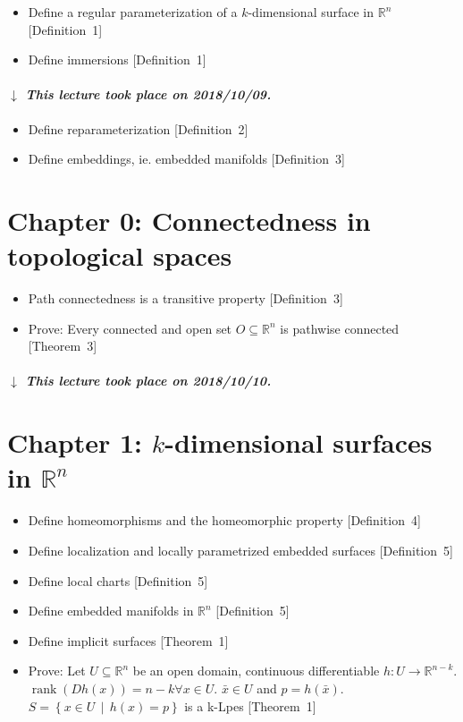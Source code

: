 \documentclass{article}
\numberwithin{lecref}{section}
\newcommand{\SetDef}[2]{\left\{#1\,\mid\,#2\right\}}
\newcommand{\dateref}[1]{%
  \begin{mdframed}[backgroundcolor=gray!10,innerbottommargin=0pt,innertopmargin=0pt]
    \paragraph{\textit{$\downarrow$ This lecture took place on #1.}}%
  \end{mdframed}%
}
\begin{document}
\begin{itemize}
  \item Define a regular parameterization of a $k$-dimensional surface in $\mathbb R^n$ [Definition~1]
  \item Define immersions [Definition~1]
\end{itemize}

\dateref{2018/10/09}

\begin{itemize}
  \item Define reparameterization [Definition~2]
  \item Define embeddings, ie. embedded manifolds [Definition~3]
\end{itemize}

\section*{Chapter 0: Connectedness in topological spaces}

\begin{itemize}
  \item Path connectedness is a transitive property [Definition~3]
  \item Prove: Every connected and open set $O \subseteq \mathbb R^n$ is pathwise connected [Theorem~3]
\end{itemize}

\dateref{2018/10/10}

\section*{Chapter 1: $k$-dimensional surfaces in $\mathbb R^n$}

\begin{itemize}
  \item Define homeomorphisms and the homeomorphic property [Definition~4]
  \item Define localization and locally parametrized embedded surfaces [Definition~5]
  \item Define local charts [Definition~5]
  \item Define embedded manifolds in $\mathbb R^n$ [Definition~5]
  \item Define implicit surfaces [Theorem~1]
  \item Prove: Let $U \subseteq \mathbb R^n$ be an open domain, continuous differentiable $h: U \to \mathbb R^{n-k}$. $\operatorname{rank}(Dh(x)) = n - k \forall x \in U$. $\bar{x} \in U$ and $p = h(\bar{x})$. $S = \SetDef{x \in U}{h(x) = p}$ is a k-Lpes [Theorem~1]
\end{itemize}
\end{document}
